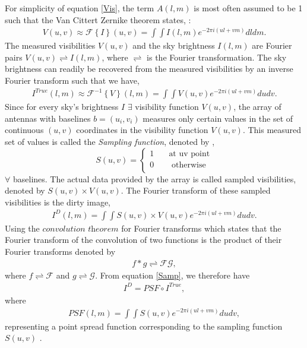 For simplicity of equation \ref{Vis}, the term $A(l,m)$ is most often assumed to be 1 such that the Van Cittert Zernike theorem states, \citep{thompson2017interferometry}:
\begin{align}
V(u,v)\approx \mathcal{F}\left\{I\right\}(u,v)=\int \int I (l,m)e^{-2\pi i(ul+vm)} dl dm.
\label{V}
\end{align}
The measured visibilities $V(u,v)$ and the sky brightness  $I(l,m)$ are Fourier pairs $V(u,v) \rightleftharpoons I(l,m)$, where $\rightleftharpoons$ is the Fourier transformation. The sky
brightness can readily be recovered from the measured visibilities by an inverse Fourier transform such that we have, 
\begin{align}
I^{True}(l,m)\approx \mathcal{F}^{-1}\left\{V\right\}(l,m)=\int \int V (u,v)e^{-2\pi i(ul+vm)} du dv .
\end{align}
Since for every sky's brightness $I$ $\exists$ visibility function $V(u,v)$, the array of antennas with baselines $b=(u_i,v_i)$  measures only certain values in the set of continuous  $(u,v)$ coordinates in the visibility function $V(u,v)$. This measured set of values is called the \emph{Sampling function}, denoted by \citep{taylor1999synthesis}, \[ S(u,v) =
  \begin{cases}
    1   & \quad    \text{at uv point}\\
    0  & \quad  \text{ otherwise}\\
  \end{cases}
\] $\forall$ baselines. The actual data provided by the array is called  sampled visibilities, denoted by  $S(u,v)\times V(u,v)$. The Fourier transform of these sampled visibilities is the dirty image,
\begin{align}
I^{D}(l,m)=\int \int S(u,v)\times V(u,v) e^{-2\pi i(ul+vm)} du dv.
\label{Samp}
\end{align} 
Using the $\textit{convolution theorem}$ for Fourier transforms which states that the Fourier transform of the convolution of two functions is the product of their Fourier transforms denoted by 
\begin{align}
f*g\rightleftharpoons \mathcal{F} \mathcal{G},
\end{align}
where $f\rightleftharpoons \mathcal{F}$ and $g\rightleftharpoons \mathcal{G}$.
From equation \ref{Samp}, we therefore have 
\begin{align}
I^{D}=PSF \circ I^{True},
\end{align}
where 
\begin{align}
PSF(l,m) = \int \int S(u,v)e^{-2\pi i(ul+vm)} du dv,
\end{align}
representing a point spread function  corresponding to the sampling function $S(u,v)$ \citep{taylor1999synthesis}.


